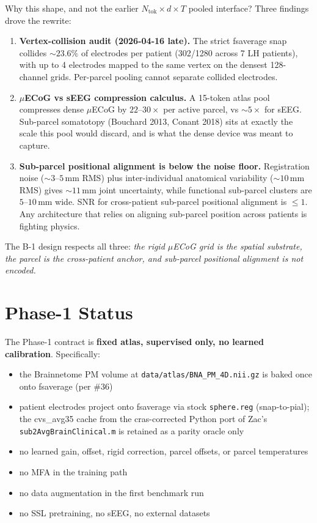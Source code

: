 \documentclass[11pt,letterpaper]{article}
\begin{document}
Why this shape, and not the earlier $N_{\text{tok}} \times d \times T$ pooled interface? Three findings drove the rewrite:
\begin{enumerate}[leftmargin=2em, itemsep=0.2em]
\item \textbf{Vertex-collision audit (2026-04-16 late).} The strict fsaverage snap collides $\sim 23.6\%$ of electrodes per patient (302/1280 across 7 LH patients), with up to 4 electrodes mapped to the same vertex on the densest 128-channel grids. Per-parcel pooling cannot separate collided electrodes.
\item \textbf{$\mu$ECoG vs sEEG compression calculus.} A 15-token atlas pool compresses dense $\mu$ECoG by $22$--$30\times$ per active parcel, vs $\sim 5\times$ for sEEG. Sub-parcel somatotopy (Bouchard 2013, Conant 2018) sits at exactly the scale this pool would discard, and is what the dense device was meant to capture.
\item \textbf{Sub-parcel positional alignment is below the noise floor.} Registration noise ($\sim 3$--$5$\,mm RMS) plus inter-individual anatomical variability ($\sim 10$\,mm RMS) gives $\sim 11$\,mm joint uncertainty, while functional sub-parcel clusters are $5$--$10$\,mm wide. SNR for cross-patient sub-parcel positional alignment is $\le 1$. Any architecture that relies on aligning sub-parcel position across patients is fighting physics.
\end{enumerate}

The B-1 design respects all three: \emph{the rigid $\mu$ECoG grid is the spatial substrate, the parcel is the cross-patient anchor, and sub-parcel positional alignment is not encoded.}


\section{Phase-1 Status}

The Phase-1 contract is \textbf{fixed atlas, supervised only, no learned calibration}. Specifically:
\begin{itemize}[leftmargin=2em, itemsep=0.2em]
\item the Brainnetome PM volume at \texttt{data/atlas/BNA\_PM\_4D.nii.gz} is baked once onto fsaverage (per \#36)
\item patient electrodes project onto fsaverage via stock \texttt{sphere.reg} (snap-to-pial); the cvs\_avg35 cache from the cras-corrected Python port of Zac's \texttt{sub2AvgBrainClinical.m} is retained as a parity oracle only
\item no learned gain, offset, rigid correction, parcel offsets, or parcel temperatures
\item no MFA in the training path
\item no data augmentation in the first benchmark run
\item no SSL pretraining, no sEEG, no external datasets
\end{itemize}
\end{document}
